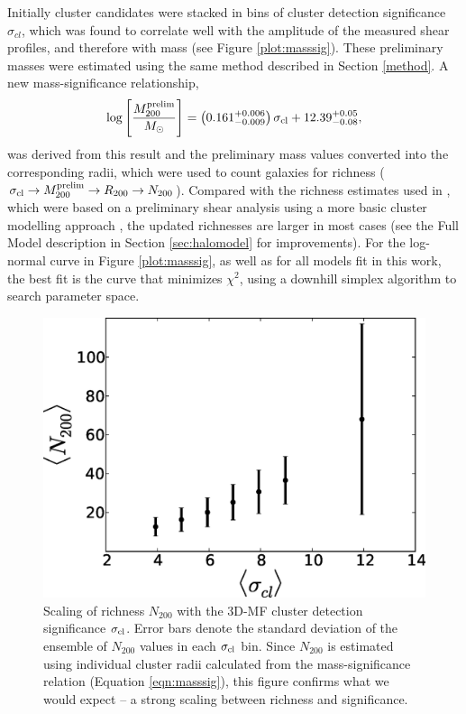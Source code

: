 Initially cluster candidates were stacked in bins of cluster detection significance $\sigma_{cl}$, which was found to correlate well with the amplitude of the measured shear profiles, and therefore with mass (see Figure \ref{plot:masssig}). These preliminary masses were estimated using the same method described in Section \ref{method}. A new mass-significance relationship,
\begin{equation}
\label{eqn:masssig}
\mathrm{log}\left[ \frac{M_{200}^{\rm prelim}}{M_{\odot}} \right] = \left( 0.161^{+0.006}_{-0.009} \right) \sigma_{\rm cl} + 12.39^{+0.05}_{-0.08},
\end{equation}
was derived from this result and the preliminary mass values converted into the corresponding radii, which were used to count galaxies for richness ($\sigma_{\rm cl} \rightarrow M_{200}^{\rm prelim} \rightarrow R_{200} \rightarrow N_{200}$). Compared with the richness estimates used in \citet{Ford14}, which were based on a preliminary shear analysis using a more basic cluster modelling approach \citep{MMthesis11}, the updated richnesses are larger in most cases (see the Full Model description in Section \ref{sec:halomodel} for improvements). For the log-normal curve in Figure \ref{plot:masssig}, as well as for all models fit in this work, the best fit is the curve that minimizes $\chi^2$, using a downhill simplex algorithm to search parameter space.

\begin{figure}
\begin{center}
\vspace{0.2cm}
  \includegraphics[scale=0.7]{plots_ch4/N200vsSig.eps}
  \caption[Richness-Significance Scaling]{Scaling of richness $N_{200}$ with the \ac{3D-MF} cluster detection significance $\sigma_{\rm cl}$. Error bars denote the standard deviation of the ensemble of $N_{200}$ values in each $\sigma_{\rm cl}$ bin. Since $N_{200}$ is estimated using individual cluster radii calculated from the mass-significance relation (Equation \ref{eqn:masssig}), this figure confirms what we would expect -- a strong scaling between richness and significance.}
\label{plot:n200sig} %
\end{center}
\end{figure}

